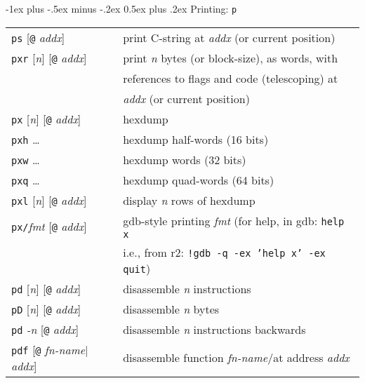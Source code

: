 \documentclass[a4paper,landscape]{article}
\makeatletter
\renewcommand{\section}{\@startsection{section}{1}{0mm}%
                                {-1ex plus -.5ex minus -.2ex}%
                                {0.5ex plus .2ex}%
                                {\normalfont\large\bfseries}}
\makeatother
\begin{document}
\begin{multicols*}{3}
\section{Printing: \texttt{p}}
\begin{tabular}{@{}ll@{}}
\texttt{ps} [\texttt{@} \textit{addx}]& print C-string at \textit{addx} (or current position) \\
\texttt{pxr} [\textit{n}] [\texttt{@} \textit{addx}] & print \textit{n} bytes (or block-size), as words, with \\ & references to flags and code (telescoping) at \\ & \textit{addx} (or current position)\\
\texttt{px} [\textit{n}] [\texttt{@} \textit{addx}] & hexdump \\
\texttt{pxh} \ldots & hexdump half-words (16 bits) \\
\texttt{pxw} \ldots & hexdump words (32 bits) \\
\texttt{pxq} \ldots & hexdump quad-words (64 bits) \\
\texttt{pxl} [\textit{n}] [\texttt{@} \textit{addx}] & display \textit{n} rows of hexdump \\
\texttt{px/}\textit{fmt} [\texttt{@} \textit{addx}] & gdb-style printing \textit{fmt} (for help, in gdb: \texttt{help x} \\ & i.e., from r2: \texttt{!gdb -q -ex 'help x' -ex quit}) \\
\texttt{pd} [\textit{n}] [\texttt{@} \textit{addx}] & disassemble \textit{n} instructions \\
\texttt{pD} [\textit{n}] [\texttt{@} \textit{addx}] & disassemble \textit{n} bytes \\
\texttt{pd} \textit{-n}  [\texttt{@} \textit{addx}] & disassemble \textit{n} instructions backwards \\
\texttt{pdf} [\texttt{@} \textit{fn-name}$|$\textit{addx}] & disassemble function \textit{fn-name}/at address \textit{addx}
\end{tabular}


\end{multicols*}
\end{document}

